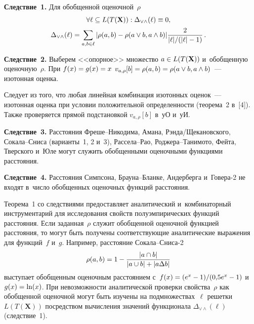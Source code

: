 \begin{multicols}{2}
\smallskip

\noindent
\textbf{Следствие~1.} Для обобщенной оценочной~$\rho$ 
\begin{multline*}
\forall \ell \subseteq L(T(\mathbf{X})): \Delta_{\vee\wedge}(\ell)\equiv 0,\\ 
\Delta_{\vee\wedge}(\ell)=  \sum\limits_{a,b\in \ell} \vert\rho(a,b)- 
\rho(a\vee b, a\wedge b)\vert \displaystyle\frac{\displaystyle 2\mathstrut}{\displaystyle \vert\ell\vert/(\vert\ell\vert -1)\mathstrut}\,.
\end{multline*}

\smallskip

\noindent
\textbf{Следствие~2.} Выберем <<опорное>> множество $a\hm\in 
L(T(\mathbf{X}))$ и~обобщенную оценочную~$\rho$. При $f(x)\hm= g(x)\hm= x$ 
$v_{a,\rho}[b]\hm= \rho(a,b)\hm= \rho(a\vee b, a\wedge b)$~--- изотонная 
оценка. 

Следует из того, что любая линейная комбинация изотонных оценок~--- 
изотонная оценка при условии положительной определенности (теорема~2 
в~[4]). Также проверяется прямой подстановкой $v_{a,\rho}[b]$ в~уО и~уИ. 

\smallskip

\noindent
\textbf{Следствие~3.} Расстояния Фре\-ше--Ни\-ко\-ди\-ма, Амана,  
Рэн\-да/Ще\-ка\-нов\-ско\-го, Со\-ка\-ла--Сни\-са (варианты~1, 2 и~3),  
Рас\-се\-ла--Рао, Род\-же\-ра--Та\-ни\-мо\-то, Фейта, Тверского и~Юле 
могут служить обобщенными оценочными функциями расстояния. 

\smallskip

\noindent
\textbf{Следствие~4.} Расстояния Симпсона, Бра\-у\-на--Блан\-ке, 
Андерберга и~Говера-2  не входят в~число обобщенных оценочных функций 
расстояния.

\smallskip

     Теорема~1 со следствиями предоставляет аналитический 
и~комбинаторный инструментарий для исследования свойств 
полуэмпирических функций расстояния. Если заданная~$\rho$ служит 
обобщенной оценочной функцией расстояния, то могут быть получены 
соответствующие аналитические выражения для функций~$f$ и~$g$. 
Например, расстояние Со\-ка\-ла--Сни\-са-2
$$
\rho(a,b) = 1- \displaystyle\frac{\displaystyle \vert a\cap 
b\vert \mathstrut}{\displaystyle \vert a\cup b\vert + \vert a\Delta b\vert\mathstrut}
$$ 
выступает 
обобщенным оценочным расстоянием с~$f(x)\hm= (e^x\hm-1)/(0{,}5e^x\hm-1)$ и~$g(x)\hm=\ln (x)$. При невозможности аналитической проверки 
свойства~$\rho$ как обобщенной оценочной могут быть изучены на 
подмножествах~$\ell$ решетки $L(T(\mathbf{X}))$ посредством вычисления 
значений функционала $\Delta_{\vee\wedge}(\ell)$ (следствие~1). 


\end{multicols}

